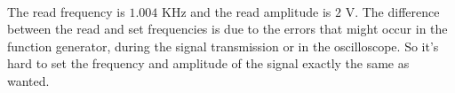 \documentclass[11pt]{article}
\begin{document}
\begin{question}
{        \paragraph*{}
        The read frequency is $1.004$ KHz and the read amplitude is $2$ V. The difference between the
        read and set frequencies is due to the errors that might occur in the function generator,
        during the signal transmission or in the oscilloscope.
        So it's hard to set the frequency and amplitude of the signal exactly the same as wanted.
    }

\end{question}

\end{document}
